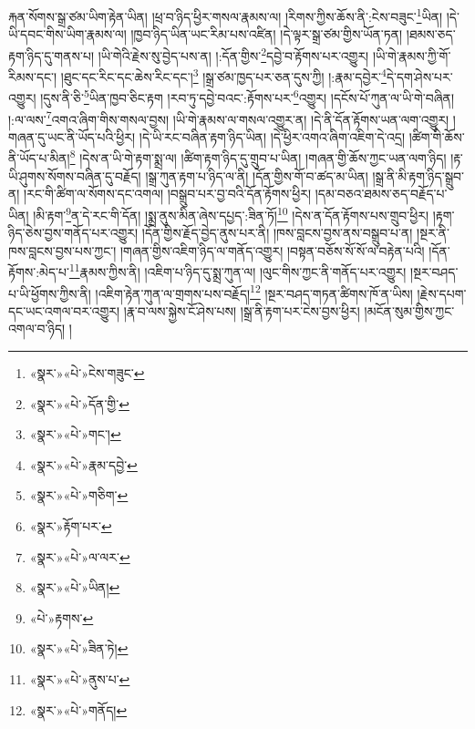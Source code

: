 རྐན་སོགས་སྒྲ་ཙམ་ཡིག་རྟེན་ཡིན། །ཕྲ་བ་ཉིད་ཕྱིར་གསལ་རྣམས་ལ། །རིགས་ཀྱིས་ཆོས་ནི་:ངེས་བཟུང་\footnote{«སྣར་»«པེ་»ངེས་གཟུང་}ཡིན། །དེ་ཡི་དབང་གིས་ཡིག་རྣམས་ལ། །ཁྱབ་ཉིད་ཡིན་ཡང་རིམ་པས་འཛིན། །དེ་ལྟར་སྒྲ་ཙམ་གྱིས་ཡོན་ཏན། །ཐམས་ཅད་རྟག་ཉིད་དུ་གནས་པ། །ཡི་གེའི་རྗེས་སུ་བྱེད་པས་ན། །:དོན་གྱིས་\footnote{«སྣར་»«པེ་»དོན་གྱི་}དབྱེ་བ་རྟོགས་པར་འགྱུར། །ཡི་གེ་རྣམས་ཀྱི་གོ་རིམས་དང་། །ཐུང་དང་རིང་དང་ཆེས་རིང་དང་།\footnote{«སྣར་»«པེ་»གང་།} །སྒྲ་ཙམ་ཁྱད་པར་ཅན་དུས་ཀྱི། །:རྣམ་དབྱེར་\footnote{«སྣར་»«པེ་»རྣམ་དབྱེ་}དེ་དག་ཤེས་པར་འགྱུར། །དུས་ནི་ཅི་\footnote{«སྣར་»«པེ་»གཅིག་}ཡིན་ཁྱབ་ཅིང་རྟག །རབ་ཏུ་དབྱེ་བའང་:རྟོགས་པར་\footnote{«སྣར་»རྟོག་པར་}འགྱུར། །དངོས་པོ་ཀུན་ལ་ཡི་གེ་བཞིན། །:ལ་ལས་\footnote{«སྣར་»«པེ་»ལ་ལར་}འགའ་ཞིག་གིས་གསལ་བྱས། །ཡི་གེ་རྣམས་ལ་གསལ་འགྱུར་ན། །དེ་ནི་དོན་རྟོགས་ཡན་ལག་འགྱུར། །གཞན་དུ་ཡང་ནི་ཡོད་པའི་ཕྱིར། །དེ་ཡི་རང་བཞིན་རྟག་ཉིད་ཡིན། །དེ་ཕྱིར་འགའ་ཞིག་འཇིག་དེ་འདྲ། །ཚིག་གི་ཆོས་ནི་ཡོད་པ་མིན།\footnote{«སྣར་»«པེ་»ཡིན།} །དེས་ན་ཡི་གེ་རྟག་སྨྲ་ལ། །ཚིག་རྟག་ཉིད་དུ་གྲུབ་པ་ཡིན། །གཞན་གྱི་ཆོས་ཀྱང་ཡན་ལག་ཉིད། །རྟ་ཡི་ཤུགས་སོགས་བཞིན་དུ་བརྗོད། །སྒྲ་ཀུན་རྟག་པ་ཉིད་ལ་ནི། །དོན་གྱིས་གོ་བ་ཚད་མ་ཡིན། །སྒྲ་ནི་མི་རྟག་ཉིད་སྒྲུབ་ན། །རང་གི་ཚིག་ལ་སོགས་དང་འགལ། །བསྒྲུབ་པར་བྱ་བའི་དོན་རྟོགས་ཕྱིར། །དམ་བཅའ་ཐམས་ཅད་བརྗོད་པ་ཡིན། །མི་རྟག་\footnote{«པེ་»རྟགས་}ན་དེ་རང་གི་དོན། །སྨྲ་ནུས་མིན་ཞེས་དཔྱད་:ཟིན་ཏོ།\footnote{«སྣར་»«པེ་»ཟིན་ཏེ།} །དེས་ན་དོན་རྟོགས་པས་གྲུབ་ཕྱིར། །རྟག་ཉིད་ཅེས་བྱས་གནོད་པར་འགྱུར། །དོན་གྱིས་རྗོད་བྱེད་ནུས་པར་ནི། །ཁས་བླངས་བྱས་ནས་བསྒྲུབ་པ་ན། །སྔར་ནི་ཁས་བླངས་བྱས་པས་ཀྱང་། །གཞན་གྱིས་འཇིག་ཉིད་ལ་གནོད་འགྱུར། །བསྟན་བཅོས་སོ་སོ་ལ་བརྟེན་པའི། །དོན་རྟོགས་:མེད་པ་\footnote{«སྣར་»«པེ་»ནུས་པ་}རྣམས་ཀྱིས་ནི། །འཇིག་པ་ཉིད་དུ་སྨྲ་ཀུན་ལ། །ལུང་གིས་ཀྱང་ནི་གནོད་པར་འགྱུར། །སྔར་བཤད་པ་ཡི་ཕྱོགས་ཀྱིས་ནི། །འཇིག་རྟེན་ཀུན་ལ་གྲགས་པས་བརྗོད།\footnote{«སྣར་»«པེ་»གནོད།} །སྔར་བཤད་གཏན་ཚིགས་ཁོ་ན་ཡིས། །རྗེས་དཔག་དང་ཡང་འགལ་བར་འགྱུར། །རྣ་བ་ལས་སྐྱེས་ངོ་ཤེས་པས། །སྒྲ་ནི་རྟག་པར་ངེས་བྱས་ཕྱིར། །མངོན་སུམ་གྱིས་ཀྱང་འགལ་བ་ཉིད། །
